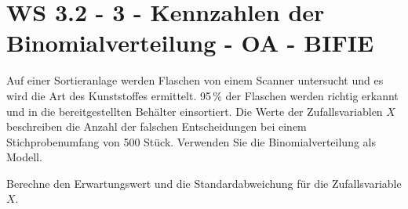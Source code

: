 \section{WS 3.2 - 3 - Kennzahlen der Binomialverteilung - OA - BIFIE}

\begin{beispiel}[WS 3.2]{1} %
Auf einer Sortieranlage werden Flaschen von einem Scanner untersucht und es wird die Art
des Kunststoffes ermittelt. 95\,\% der Flaschen werden richtig erkannt und in die bereitgestellten Behälter einsortiert. Die Werte der Zufallsvariablen $X$ beschreiben die Anzahl der falschen Entscheidungen bei einem Stichprobenumfang von 500 Stück. Verwenden Sie die Binomialverteilung als Modell.

Berechne den Erwartungswert und die Standardabweichung für die Zufallsvariable $X$.

\end{beispiel} 